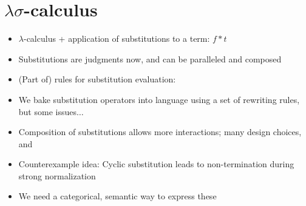 \documentclass[11pt]{article}
\begin{document}
\section[Lambda-sigma-calculus]{$\lambda\sigma$-calculus}
\begin{itemize}
    \item $\lambda$-calculus + application of substitutions to a term: $f \ast t$
    \item Substitutions are judgments now, and can be paralleled and composed
    \item (Part of) rules for substitution evaluation:
    \item We bake substitution operators into language using a set of rewriting rules, but some issues$\ldots$
    \item Composition of substitutions allows more interactions; many design choices, and
    \item Counterexample idea: Cyclic substitution leads to non-termination during strong normalization
    \item We need a categorical, semantic way to express these
\end{itemize}
\end{document}
